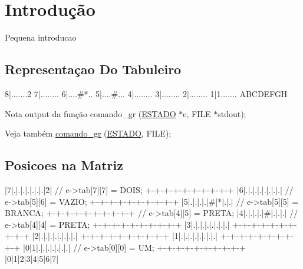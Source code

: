 \section*{Introdução}

Pequena introducao

\subsection*{Representaçao Do Tabuleiro}

\begin{DoxyVerb}8|.......2
7|........
6|....#*..
5|....#...
4|........
3|........
2|........
1|1.......
  ABCDEFGH
\end{DoxyVerb}
 \begin{DoxyNote}{Nota}
output da função comando\+\_\+gr (\hyperlink{structESTADO}{E\+S\+T\+A\+DO} $\ast$e, F\+I\+LE $\ast$stdout); 
\end{DoxyNote}
\begin{DoxySeeAlso}{Veja também}
\hyperlink{io_8h_ab03327c1cfcf23429c480c863b0e74bb}{comando\+\_\+gr} (\hyperlink{structESTADO}{E\+S\+T\+A\+DO}, F\+I\+LE);
\end{DoxySeeAlso}
\subsection*{Posicoes na Matriz}

\begin{DoxyVerb}|7|.|.|.|.|.|.|.|2| // e->tab[7][7] = DOIS;
+-+-+-+-+-+-+-+-+-+
|6|.|.|.|.|.|.|.|.| // e->tab[5][6] = VAZIO;
+-+-+-+-+-+-+-+-+-+
|5|.|.|.|.|#|*|.|.| // e->tab[5][5] = BRANCA;
+-+-+-+-+-+-+-+-+-+ // e->tab[4][5] = PRETA;
|4|.|.|.|.|#|.|.|.| // e->tab[4][4] = PRETA;
+-+-+-+-+-+-+-+-+-+
|3|.|.|.|.|.|.|.|.|
+-+-+-+-+-+-+-+-+-+
|2|.|.|.|.|.|.|.|.|
+-+-+-+-+-+-+-+-+-+
|1|.|.|.|.|.|.|.|.|
+-+-+-+-+-+-+-+-+-+
|0|1|.|.|.|.|.|.|.| // e->tab[0][0] = UM;
+-+-+-+-+-+-+-+-+-+
  |0|1|2|3|4|5|6|7|\end{DoxyVerb}
 
